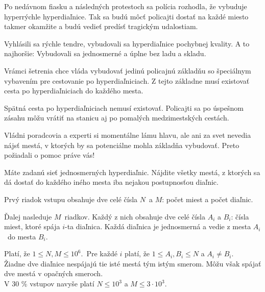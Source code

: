 





Po nedávnom fiasku a následných protestoch sa polícia rozhodla, že vybuduje
hyperrýchle hyperdiaľnice. Tak sa budú môcť policajti dostať na každé miesto takmer
okamžite a budú vedieť predísť tragickým udalostiam.

Vyhlásili sa rýchle tendre, vybudovali sa hyperdiaľnice pochybnej kvality. A to
najhoršie: Vybudovali sa jednosmerné a úplne bez ladu a skladu.

Vrámci šetrenia chce vláda vybudovať jedinú policajnú základňu so špeciálnym
vybavením pre cestovanie po hyperdiaľniciach. Z tejto základne musí existovať
cesta po hyperdiaľniciach do každého mesta.

Spätná cesta po hyperdiaľniciach nemusí existovať. Policajti sa po úspešnom
zásahu môžu vrátiť na stanicu aj po pomalých medzimestských cestách.

Vládni poradcovia a experti si momentálne lámu hlavu, ale ani za svet nevedia
nájsť mestá, v ktorých by sa potenciálne mohla základňa vybudovať. Preto požiadali
o pomoc práve vás!


Máte zadanú sieť jednosmerných hyperdiaľnic. Nájdite všetky mestá, z ktorých
sa dá dostať do každého iného mesta iba nejakou postupnosťou diaľnic.


Prvý riadok vstupu obsahuje dve celé čísla $N$ a $M$: počet miest a počet
diaľnic.

Ďalej nasleduje $M$ riadkov. Každý z nich obsahuje dve celé čísla $A_i$ a $B_i$:
čísla miest, ktoré spája $i$-ta diaľnica. Každá diaľnica je jednosmerná a vedie
z mesta $A_i$ do mesta $B_i$.

\bigskip
\noindent
Platí, že $1 \leq N, M \leq 10^6$.\
Pre každé $i$ platí, že $1 \leq A_i, B_i \leq N$ a $A_i \neq B_i$.\\
Žiadne dve diaľnice nespájajú tie isté mestá tým istým smerom. Môžu však
spájať dve mestá v opačných smeroch. \\
V 30 \% vstupov navyše platí $N \leq 10^3$ a $M \leq 3 \cdot 10^3$.


